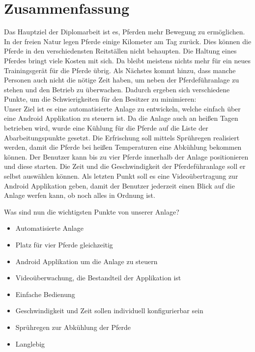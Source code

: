 \section*{Zusammenfassung}

Das Hauptziel der Diplomarbeit ist es, Pferden mehr Bewegung zu ermöglichen. In der freien Natur legen Pferde einige Kilometer am Tag zurück. Dies können die Pferde in den verschiedensten Reitställen nicht behaupten. Die Haltung eines Pferdes bringt viele Kosten mit sich. Da bleibt meistens nichts mehr für ein neues Trainingsgerät für die Pferde übrig. Als Nächstes kommt hinzu, dass manche Personen auch nicht die nötige Zeit haben, um neben der Pferdeführanlage zu stehen und den Betrieb zu überwachen. Dadurch ergeben sich verschiedene Punkte, um die Schwierigkeiten für den Besitzer zu minimieren: \\
Unser Ziel ist es eine automatisierte Anlage zu entwickeln, welche einfach über eine Android Applikation zu steuern ist. Da die Anlage auch an heißen Tagen betrieben wird, wurde eine Kühlung für die Pferde auf die Liste der Abarbeitungspunkte gesetzt. Die Erfrischung soll mittels Sprühregen realisiert werden, damit die Pferde bei heißen Temperaturen eine Abkühlung bekommen können. Der Benutzer kann bis zu vier Pferde innerhalb der Anlage positionieren und diese starten. Die Zeit und die Geschwindigkeit der Pferdeführanlage soll er selbst auswählen können. Als letzten Punkt soll es eine Videoübertragung zur Android Applikation geben, damit der Benutzer jederzeit einen Blick auf die Anlage werfen kann, ob noch alles in Ordnung ist.  \newline{}
 
Was sind nun die wichtigsten Punkte von unserer Anlage?\\

\begin{itemize}
\item{Automatisierte Anlage}
\item{Platz für vier Pferde gleichzeitig}
\item{Android Applikation um die Anlage zu steuern}
\item{Videoüberwachung, die Bestandteil der Applikation ist}
\item{Einfache Bedienung}
\item{Geschwindigkeit und Zeit sollen individuell konfigurierbar sein} 
\item{Sprühregen zur Abkühlung der Pferde}
\item{Langlebig}
\end{itemize}

